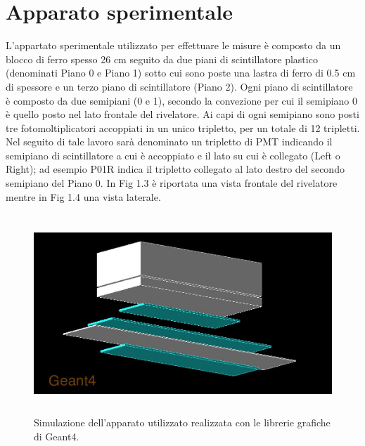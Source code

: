 \documentclass{standalone}
\begin{document}
\section{Apparato sperimentale}
L'appartato sperimentale utilizzato per effettuare le misure è composto da un blocco di ferro spesso 26 cm seguito da due piani di scintillatore plastico (denominati Piano 0 e Piano 1) sotto cui sono poste una lastra di ferro di 0.5 cm di spessore e un terzo piano di scintillatore (Piano 2).
Ogni piano di scintillatore è composto da due semipiani (0 e 1), secondo la convezione per cui il semipiano 0 è quello posto nel lato frontale del rivelatore. Ai capi di ogni semipiano sono posti tre fotomoltiplicatori accoppiati in un unico tripletto, per un totale di 12 tripletti. Nel seguito di tale lavoro sarà denominato un tripletto di PMT indicando il semipiano di scintillatore a cui è accoppiato e il lato su cui è collegato (Left o Right); ad esempio P01R indica il tripletto collegato al lato destro del secondo semipiano del Piano 0.
In Fig 1.3 è riportata una vista frontale del rivelatore mentre in Fig 1.4 una vista laterale.

\begin{figure}[H]
	\centering
  \includegraphics[width=12cm, height=7.5cm]{images/general.jpg}
  \caption{Simulazione dell'apparato utilizzato realizzata con le librerie grafiche di Geant4.}
\end{figure}
\end{document}
